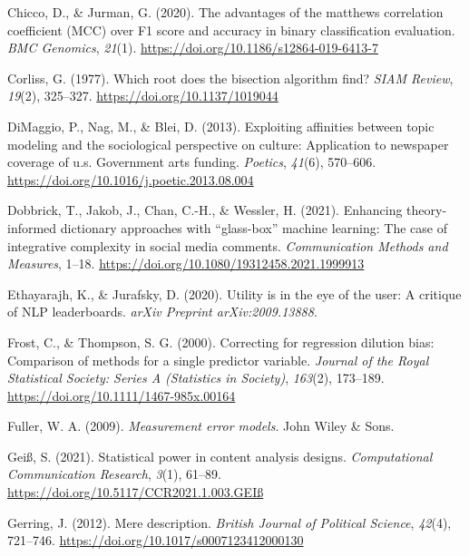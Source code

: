 \documentclass[english,man,floatsintext]{apa6}
\begin{document}
\leavevmode\hypertarget{ref-chicco:2020:MMF}{}%
Chicco, D., \& Jurman, G. (2020). The advantages of the matthews correlation coefficient (MCC) over F1 score and accuracy in binary classification evaluation. \emph{BMC Genomics}, \emph{21}(1). \url{https://doi.org/10.1186/s12864-019-6413-7}

\leavevmode\hypertarget{ref-corliss:1977:WRD}{}%
Corliss, G. (1977). Which root does the bisection algorithm find? \emph{SIAM Review}, \emph{19}(2), 325--327. \url{https://doi.org/10.1137/1019044}

\leavevmode\hypertarget{ref-dimaggio:2013:E}{}%
DiMaggio, P., Nag, M., \& Blei, D. (2013). Exploiting affinities between topic modeling and the sociological perspective on culture: Application to newspaper coverage of u.s. Government arts funding. \emph{Poetics}, \emph{41}(6), 570--606. \url{https://doi.org/10.1016/j.poetic.2013.08.004}

\leavevmode\hypertarget{ref-dobbrick:2021:ETI}{}%
Dobbrick, T., Jakob, J., Chan, C.-H., \& Wessler, H. (2021). Enhancing theory-informed dictionary approaches with ``glass-box'' machine learning: The case of integrative complexity in social media comments. \emph{Communication Methods and Measures}, 1--18. \url{https://doi.org/10.1080/19312458.2021.1999913}

\leavevmode\hypertarget{ref-ethayarajh2020utility}{}%
Ethayarajh, K., \& Jurafsky, D. (2020). Utility is in the eye of the user: A critique of NLP leaderboards. \emph{arXiv Preprint arXiv:2009.13888}.

\leavevmode\hypertarget{ref-frost:2000:C}{}%
Frost, C., \& Thompson, S. G. (2000). Correcting for regression dilution bias: Comparison of methods for a single predictor variable. \emph{Journal of the Royal Statistical Society: Series A (Statistics in Society)}, \emph{163}(2), 173--189. \url{https://doi.org/10.1111/1467-985x.00164}

\leavevmode\hypertarget{ref-fuller2009measurement}{}%
Fuller, W. A. (2009). \emph{Measurement error models}. John Wiley \& Sons.

\leavevmode\hypertarget{ref-geiss2021statistical}{}%
Geiß, S. (2021). Statistical power in content analysis designs. \emph{Computational Communication Research}, \emph{3}(1), 61--89. \url{https://doi.org/10.5117/CCR2021.1.003.GEIß}

\leavevmode\hypertarget{ref-gerring:2012:MD}{}%
Gerring, J. (2012). Mere description. \emph{British Journal of Political Science}, \emph{42}(4), 721--746. \url{https://doi.org/10.1017/s0007123412000130}
\end{document}
